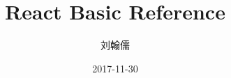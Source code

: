 \documentclass{book}
\begin{document}
\begin{CJK*}{UTF8}{gbsn}
\title{React Basic Reference}
\author{刘翰儒}
\date{2017-11-30}
\maketitle
\tableofcontents
\chapter{}
\end{CJK*}
\end{document}
